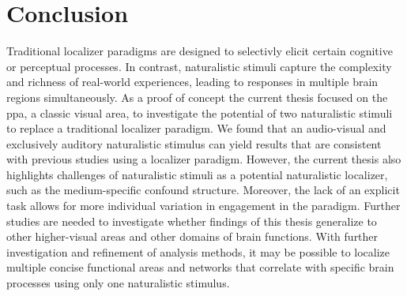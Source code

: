 \section{Conclusion}



%
Traditional localizer paradigms are designed to selectivly elicit certain
cognitive or perceptual processes.
%
In contrast, naturalistic stimuli capture the complexity and richness of
real-world experiences, leading to responses in multiple brain regions
simultaneously.
%
As a proof of concept the current thesis focused on the \ac{ppa}, a classic
visual area, to investigate the potential of two naturalistic stimuli to replace
a traditional localizer paradigm.
%
We found that an audio-visual and exclusively auditory naturalistic stimulus can
yield results that are consistent with previous studies using a localizer
paradigm.
%
However, the current thesis also highlights challenges of naturalistic stimuli
as a potential naturalistic localizer, such as the medium-specific confound
structure.
%
Moreover, the lack of an explicit task allows for more individual variation in
engagement in the paradigm.
Further studies are needed to investigate whether findings of this thesis
generalize to other higher-visual areas and other domains of brain functions.
%
With further investigation and refinement of analysis methods, it may be
possible to localize multiple concise functional areas and networks that
correlate with specific brain processes using only one naturalistic stimulus.


